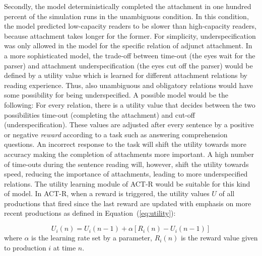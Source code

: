 \documentclass{cambridge7A}\usepackage[]{graphicx}\usepackage[]{color}
\begin{document}
Secondly, the model deterministically completed the attachment in one hundred percent of the simulation runs in the unambiguous condition. In this condition, the model predicted low-capacity readers to be slower than high-capacity readers, because attachment takes longer for the former. For simplicity, underspecification was only allowed in the model for the specific relation of adjunct attachment.
In a more sophisticated model, the trade-off between time-out (the eyes wait for the parser) and attachment underspecification (the eyes cut off the parser) would be defined by a utility value which is learned for different attachment relations by reading experience. Thus, also unambiguous and obligatory relations would have some possibility for being underspecified. 
A possible model would be the following:
For every relation, there is a utility value that decides between the two possibilities time-out (completing the attachment) and cut-off (underspecification). These values are adjusted after every sentence by a positive or negative \emph{reward} according to a task such as answering comprehension questions. An incorrect response to the task will shift the utility towards more accuracy making the completion of attachments more important. A high number of time-outs during the sentence reading will, however, shift the utility towards speed, reducing the importance of attachments, leading to more underspecified relations. 
The utility learning module of ACT-R would be suitable for this kind of model. In ACT-R, when a reward is triggered, the utility values $U$ of all productions that fired since the last reward are updated with emphasis on more recent productions as defined in Equation~(\ref{eq:utility}):

\begin{equation}
\label{eq:utility}
U_i(n) = U_i(n-1) + \alpha[R_i(n)-U_i(n-1)]
\end{equation}
where $\alpha$ is the learning rate set by a parameter, $R_i(n)$ is the reward value given to production $i$ at time $n$.
\end{document}
